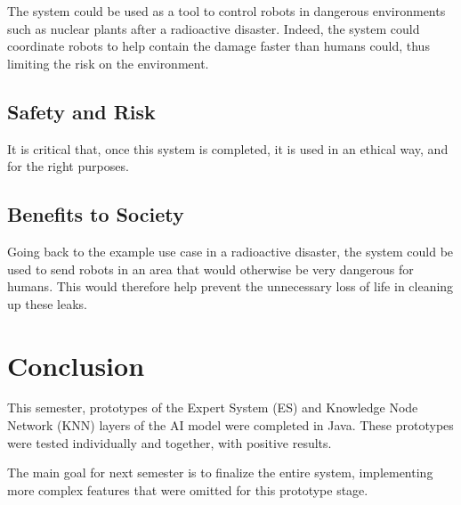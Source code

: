 \documentclass[titlepage,11pt]{article}
\begin{document}
The system could be used as a tool to control robots in dangerous environments such as nuclear plants after a radioactive disaster. Indeed, the system could coordinate robots to help contain the damage faster than humans could, thus limiting the risk on the environment.

\subsection{Safety and Risk}

It is critical that, once this system is completed, it is used in an ethical way, and for the right purposes.

\subsection{Benefits to Society}

Going back to the example use case in a radioactive disaster, the system could be used to send robots in an area that would otherwise be very dangerous for humans. This would therefore help prevent the unnecessary loss of life in cleaning up these leaks.

\section{Conclusion}

This semester, prototypes of the Expert System (ES) and Knowledge Node Network (KNN) layers of the AI model were completed in Java. These prototypes were tested individually and together, with positive results.

The main goal for next semester is to finalize the entire system, implementing more complex features that were omitted for this prototype stage.

\clearpage

{}

\end{document}

